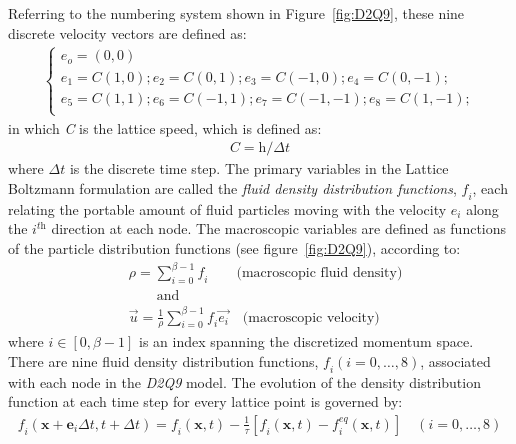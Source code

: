 Referring to the numbering system shown in Figure~\ref{fig:D2Q9}, these nine discrete velocity vectors are defined as:
\begin{align} 
\begin{cases}
\textit{e}_{\textit{o}}=(0,0)\\
\textit{e}_{\textit{1}}=\textit{C}(1,0); \textit{e}_{\textit{2}}=\textit{C}(0,1); \textit{e}_{\textit{3}}=\textit{C}(-1,0); \textit{e}_{\textit{4}}=\textit{C}(0,-1); \\
\textit{e}_{\textit{5}}=\textit{C}(1,1); \textit{e}_{\textit{6}}=\textit{C}(-1,1); \textit{e}_{\textit{7}}=\textit{C}(-1,-1); \textit{e}_{\textit{8}}=\textit{C}(1,-1); \\ 
\end{cases}
\end{align}
in which \textit{C} is the lattice speed, which is defined as:
\begin{align}
\textit{C}=\textit{h}/\Delta t
\end{align}
where $\Delta \textit{t}$ is the discrete time step. The primary variables in the Lattice Boltzmann formulation are called the \textit{fluid density distribution functions}, $\textit{f}_{\textit{i}}$, each relating the portable amount of fluid particles moving with the velocity $\textit{e}_{\textit{i}}$ along the $\textit{i}^{\textit{th}}$ direction at each node. The macroscopic variables are defined as functions of the particle distribution functions (see figure~\ref{fig:D2Q9}), according to:
\begin{align} 
 \nonumber
& \rho=\sum\limits_{\textit{i}=0}^{\beta - 1}{\textit{f}_{\textit{i}}} \qquad \mbox{(macroscopic fluid density)} \\ 
 \nonumber
& \qquad \mbox{and} \\ 
& \overrightarrow{\textit{u}}=\frac{1}{\rho} \sum\limits_{\textit{i}=0}^{\beta -1}{\textit{f}_{\textit{i}}\overrightarrow{\textit{e}_{\textit{i}}}} \quad \mbox{(macroscopic velocity)}
\label{eq:lbm_macroscopic}
\end{align} 
where $\textit{i} \in [0, \beta -1]$ is an index spanning the discretized momentum space. There are nine fluid density distribution functions, $\textit{f}_{\textit{i}}(\textit{i}=0,\dots,8)$, associated with each node in the \textit{D2Q9} model. The evolution of the density distribution function at each time step for every lattice point is governed by:
\begin{align} 
\label{eq:stream}
\textit{f}_{\textit{i}}(\mathbf{x}+\mathbf{e}_{\textit{i}} \Delta t, t + \Delta t) = \textit{f}_{\textit{i}}(\mathbf{x},t) - \frac{1}{\tau} [\textit{f}_{\textit{i}}(\mathbf{x},t) -\textit{f}_{\textit{i}}^{\textit{eq}}(\mathbf{x},t)] \quad (\textit{i}=0,\dots,8)
\end{align}
